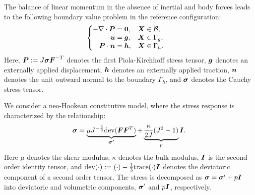 The balance of linear momentum in the absence of inertial and body forces
leads to the following boundary value problem in the reference configuration:
%
\begin{gather}
\begin{cases}
\begin{aligned}
- \nabla \cdot \boldsymbol{P} &= \boldsymbol{0}, && \boldsymbol{X} \in \mathcal{B}, \\
\boldsymbol{u} &= \boldsymbol{g}, && \boldsymbol{X} \in \Gamma_g, \\
\boldsymbol{P} \cdot \boldsymbol{n} &= \boldsymbol{h}, && \boldsymbol{X} \in \Gamma_h.
\end{aligned}
\end{cases}
\label{eq:mech_linear_momentum}
\end{gather}
%
Here, $\boldsymbol{P} := J \boldsymbol{\sigma} \boldsymbol{F}^{-T}$ denotes the first Piola-Kirchhoff
stress tensor, $\boldsymbol{g}$ denotes an externally applied displacement, $\boldsymbol{h}$
denotes an externally applied traction, $\boldsymbol{n}$ denotes the unit outward
normal to the boundary $\Gamma_h$, and $\boldsymbol{\sigma}$ denotes the Cauchy
stress tensor.

We consider a neo-Hookean constitutive model, where the stress response
is characterized by the relationship:
%
\begin{gather}
\boldsymbol{\sigma} =
\underbrace{\mu J^{-\frac53} \text{dev}(\boldsymbol{F}\boldsymbol{F}^T)}_{\boldsymbol{\sigma}'} +
\underbrace{\frac{\kappa}{2 J}(J^2 - 1)}_{p} \boldsymbol{I}.
\label{eq:mech_neohookean_model}
\end{gather}
%
Here $\mu$ denotes the shear modulus, $\kappa$ denotes the bulk modulus,
$\boldsymbol{I}$ is the second order identity tensor, and $\text{dev}(\cdot) :=
(\cdot) - \frac13 \text{trace}(\cdot) \boldsymbol{I}$ denotes the deviatoric component
of a second order tensor. The stress is decomposed as $\boldsymbol{\sigma} =
\boldsymbol{\sigma}' + p \boldsymbol{I}$ into deviatoric and volumetric components,
$\boldsymbol{\sigma}'$ and $p \boldsymbol{I}$, respectively.

